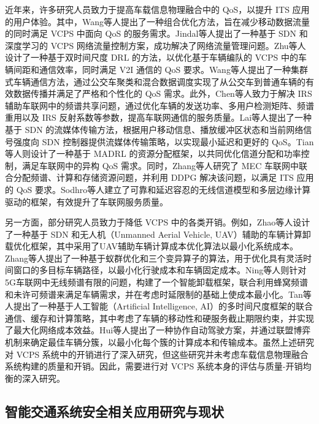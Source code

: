 近年来，许多研究人员致力于提高车载信息物理融合中的 QoS，以提升 ITS 应用的用户体验。其中，Wang等人\cite{wang2016offloading}提出了一种组合优化方法，旨在减少移动数据流量的同时满足 VCPS 中面向 QoS 的服务需求。Jindal等人\cite{jindal2018sedative}提出了一种基于 SDN 和深度学习的 VCPS 网络流量控制方案，成功解决了网络流量管理问题。Zhu等人\cite{zhu2022joint}设计了一种基于双时间尺度 DRL 的方法，以优化基于车辆编队的 VCPS 中的车辆间距和通信效率，同时满足 V2I 通信的 QoS 要求。Wang等人\cite{wang2023a}提出了一种集群式车辆通信方法，通过公交车聚类和混合数据调度实现了从公交车到普通车辆的有效数据传播并满足了严格和个性化的 QoS 需求。此外，Chen等人\cite{chen2021qos}致力于解决 IRS 辅助车联网中的频谱共享问题，通过优化车辆的发送功率、多用户检测矩阵、频谱重用以及 IRS 反射系数等参数，提高车联网通信的服务质量。Lai等人\cite{lai2017a}提出了一种基于 SDN 的流媒体传输方法，根据用户移动信息、播放缓冲区状态和当前网络信号强度向 SDN 控制器提供流媒体传输策略，以实现最小延迟和更好的 QoS。Tian等人\cite{tian2022multiagent}则设计了一种基于 MADRL 的资源分配框架，以共同优化信道分配和功率控制，满足车联网中的异构 QoS 需求。同时，Zhang等人\cite{zhang2020hierarchical}研究了 MEC 车联网中联合分配频谱、计算和存储资源问题，并利用 DDPG 解决该问题，以满足 ITS 应用的 QoS 要求。Sodhro等人\cite{sodhro2020ai}建立了可靠和延迟容忍的无线信道模型和多层边缘计算驱动的框架，有效提升了车联网服务质量。

另一方面，部分研究人员致力于降低 VCPS 中的各类开销。例如，Zhao等人\cite{zhao2021a}设计了一种基于 SDN 和无人机（Unmanned Aerial Vehicle, UAV）辅助的车辆计算卸载优化框架，其中采用了UAV辅助车辆计算成本优化算法以最小化系统成本。Zhang等人\cite{zhang2019hybrid}提出了一种基于蚁群优化和三个变异算子的算法，用于优化具有灵活时间窗口的多目标车辆路径，以最小化行驶成本和车辆固定成本。Ning等人\cite{ning2020when}则针对5G车联网中无线频谱有限的问题，构建了一个智能卸载框架，联合利用蜂窝频谱和未许可频谱来满足车辆需求，并在考虑时延限制的基础上使成本最小化。Tan等人\cite{tan2019twin}提出了一种基于人工智能（Artificial Intelligence, AI）的多时间尺度框架的联合通信、缓存和计算策略，其中考虑了车辆的移动性和硬服务截止期限约束，并实现了最大化网络成本效益。Hui等人\cite{hui2022collaboration}提出了一种协作自动驾驶方案，并通过联盟博弈机制来确定最佳车辆分簇，以最小化每个簇的计算成本和传输成本。虽然上述研究对 VCPS 系统中的开销进行了深入研究，但这些研究并未考虑车载信息物理融合系统构建的质量和开销。因此，需要进行对 VCPS 系统本身的评估与质量-开销均衡的深入研究。

\subsection{智能交通系统安全相关应用研究与现状}

